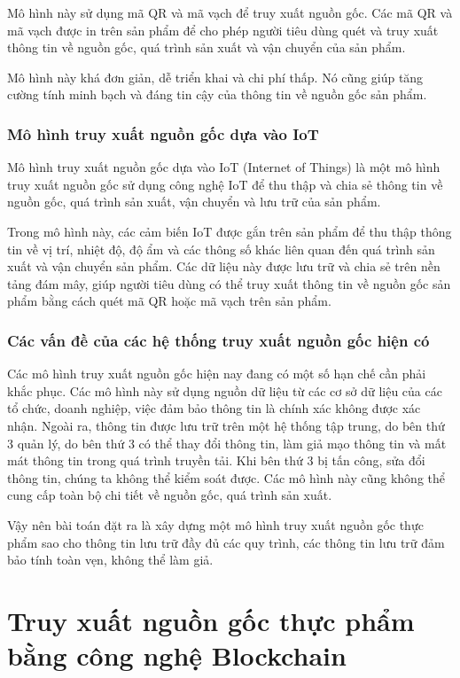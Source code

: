 Mô hình này sử dụng mã QR và mã vạch để truy xuất nguồn gốc. Các mã QR và mã vạch 
được in trên sản phẩm để cho phép người tiêu dùng quét và truy xuất thông tin về 
nguồn gốc, quá trình sản xuất và vận chuyển của sản phẩm.

Mô hình này khá đơn giản, dễ triển khai và chi phí thấp. Nó cũng giúp tăng cường 
tính minh bạch và đáng tin cậy của thông tin về nguồn gốc sản phẩm.
\subsubsection{Mô hình truy xuất nguồn gốc dựa vào IoT }
Mô hình truy xuất nguồn gốc dựa vào IoT (Internet of Things) là một mô hình truy 
xuất nguồn gốc sử dụng công nghệ IoT để thu thập và chia sẻ thông tin về nguồn gốc, 
quá trình sản xuất, vận chuyển và lưu trữ của sản phẩm.

Trong mô hình này, các cảm biến IoT được gắn trên sản phẩm để thu thập thông tin 
về vị trí, nhiệt độ, độ ẩm và các thông số khác liên quan đến quá trình sản xuất 
và vận chuyển sản phẩm. Các dữ liệu này được lưu trữ và chia sẻ trên nền tảng 
đám mây, giúp người tiêu dùng có thể truy xuất thông tin về nguồn gốc sản phẩm 
bằng cách quét mã QR hoặc mã vạch trên sản phẩm.

\subsubsection{Các vấn đề của các hệ thống truy xuất nguồn gốc hiện có}

Các mô hình truy xuất nguồn gốc hiện nay đang có một số hạn chế cần phải khắc phục. 
Các mô hình này sử dụng nguồn dữ liệu từ các cơ sở dữ liệu của các tổ chức, doanh
nghiệp, việc đảm bảo thông tin là chính xác không được xác nhận. Ngoài ra, thông 
tin được lưu trữ trên một hệ thống tập trung, do bên thứ 3 quản lý, do bên thứ 3
có thể thay đổi thông tin, làm giả mạo thông tin và mất mát thông tin trong quá
trình truyền tải. Khi bên thứ 3 bị tấn công, sửa đổi thông tin, chúng ta không 
thể kiểm soát được. Các mô hình này cũng không thể cung cấp toàn bộ chi tiết 
về nguồn gốc, quá trình sản xuất.

Vậy nên bài toán đặt ra là xây dựng một mô hình truy xuất nguồn gốc thực phẩm
sao cho thông tin lưu trữ đầy đủ các quy trình, các thông tin lưu trữ đảm bảo tính
toàn vẹn, không thể làm giả.


\section{Truy xuất nguồn gốc thực phẩm bằng công nghệ Blockchain}

